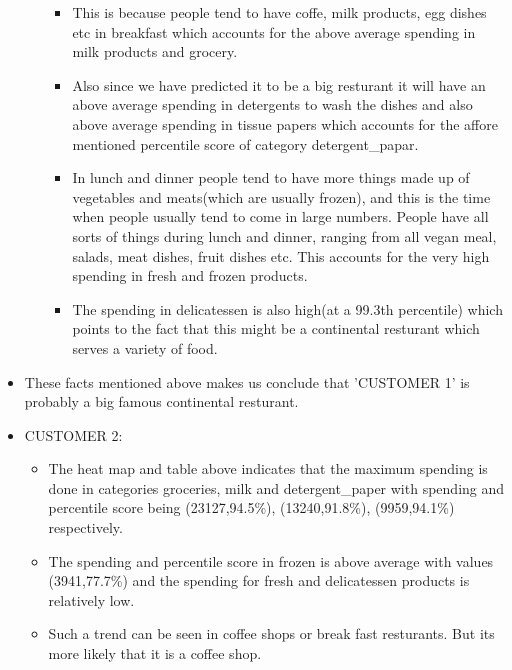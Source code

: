 \documentclass[11pt]{article}
\providecommand{\tightlist}{%
      \setlength{\itemsep}{0pt}\setlength{\parskip}{0pt}}
\begin{document}
\begin{itemize}
\begin{itemize}
    \begin{itemize}
    \tightlist
    \item
      This is because people tend to have coffe, milk products, egg
      dishes etc in breakfast which accounts for the above average
      spending in milk products and grocery.
    \item
      Also since we have predicted it to be a big resturant it will have
      an above average spending in detergents to wash the dishes and
      also above average spending in tissue papers which accounts for
      the affore mentioned percentile score of category
      detergent\_papar.
    \item
      In lunch and dinner people tend to have more things made up of
      vegetables and meats(which are usually frozen), and this is the
      time when people usually tend to come in large numbers. People
      have all sorts of things during lunch and dinner, ranging from all
      vegan meal, salads, meat dishes, fruit dishes etc. This accounts
      for the very high spending in fresh and frozen products.
    \item
      The spending in delicatessen is also high(at a 99.3th percentile)
      which points to the fact that this might be a continental
      resturant which serves a variety of food.
    \end{itemize}
  \end{itemize}
\item
  These facts mentioned above makes us conclude that 'CUSTOMER 1' is
  probably a big famous continental resturant.
\item
  CUSTOMER 2:

  \begin{itemize}
  \tightlist
  \item
    The heat map and table above indicates that the maximum spending is
    done in categories groceries, milk and detergent\_paper with
    spending and percentile score being (23127,94.5\%), (13240,91.8\%),
    (9959,94.1\%) respectively.
  \item
    The spending and percentile score in frozen is above average with
    values (3941,77.7\%) and the spending for fresh and delicatessen
    products is relatively low.
  \item
    Such a trend can be seen in coffee shops or break fast resturants.
    But its more likely that it is a coffee shop.


\end{itemize}
\end{itemize}
\end{document}

